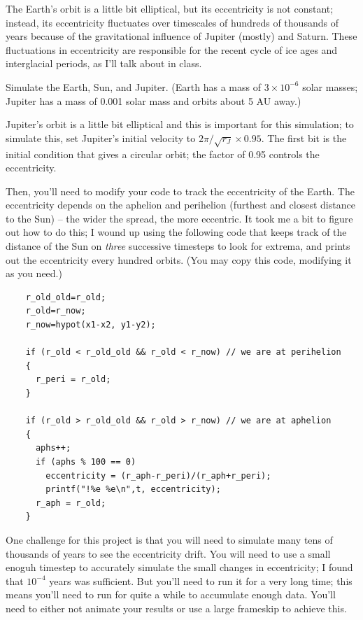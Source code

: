 \documentclass[12pt]{article}
\begin{document}
The Earth's orbit is a little bit elliptical, but its eccentricity is not constant; instead, its eccentricity fluctuates over timescales of hundreds of thousands of years because of the gravitational influence of Jupiter (mostly) and Saturn.
These fluctuations in eccentricity are responsible for the recent cycle of ice ages and interglacial periods, as I'll talk about in class.

Simulate the Earth, Sun, and Jupiter. (Earth has a mass of $3 \times 10^{-6}$ solar masses; Jupiter has a mass of 0.001 solar mass and orbits about 5 AU away.)

Jupiter's orbit is a little bit elliptical and this is important for this simulation; to simulate this, set Jupiter's initial velocity to $2\pi / \sqrt{r_J} \times 0.95$. The first bit is the initial condition that gives a circular orbit; the factor of 0.95 
controls the eccentricity.

Then, you'll need to modify your code to track the eccentricity of the Earth. The eccentricity depends on the aphelion and perihelion (furthest and closest distance to the Sun) -- the wider the spread, the more eccentric. 
It took me a bit to figure out how to do this; I wound up using the following code that keeps track of the distance of the Sun on {\it three} successive timesteps to look for extrema, and prints out the eccentricity every
hundred orbits. (You may copy this code, modifying it as you need.)

\begin{verbatim}
    r_old_old=r_old;
    r_old=r_now;
    r_now=hypot(x1-x2, y1-y2);

    if (r_old < r_old_old && r_old < r_now) // we are at perihelion
    {
      r_peri = r_old;
    }

    if (r_old > r_old_old && r_old > r_now) // we are at aphelion
    {
      aphs++;
      if (aphs % 100 == 0)
        eccentricity = (r_aph-r_peri)/(r_aph+r_peri);
        printf("!%e %e\n",t, eccentricity);
      r_aph = r_old;
    }
\end{verbatim}

One challenge for this project is that you will need to simulate many tens of thousands of years to see the eccentricity drift. You will need to use a small enoguh timestep to accurately simulate the small changes in eccentricity; I found that $10^{-4}$ years was
sufficient. But you'll need to run it for a very long time; this means you'll need to run for quite a while to accumulate enough data. You'll need to either not animate your results or use a large frameskip to achieve this.
\end{document}
